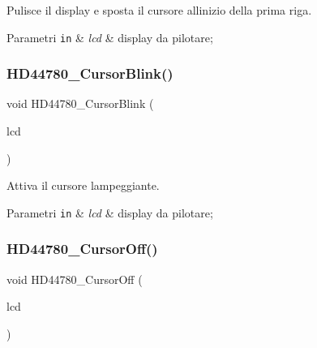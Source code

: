 Pulisce il display e sposta il cursore all\textquotesingle{}inizio della prima riga. 


\begin{DoxyParams}[1]{Parametri}
\mbox{\tt in}  & {\em lcd} & display da pilotare; \\
\hline
\end{DoxyParams}
\mbox{\label{group___h_d44780_ga92eb58cb7d73c9a87b7087a9c56f73d5}} 
\subsubsection{\texorpdfstring{H\+D44780\+\_\+\+Cursor\+Blink()}{HD44780\_CursorBlink()}}
{\footnotesize\ttfamily void H\+D44780\+\_\+\+Cursor\+Blink (\begin{DoxyParamCaption}\item[{\hyperlink{struct_h_d44780___l_c_d__t}{H\+D44780\+\_\+\+L\+C\+D\+\_\+t} $\ast$}]{lcd }\end{DoxyParamCaption})}



Attiva il cursore lampeggiante. 


\begin{DoxyParams}[1]{Parametri}
\mbox{\tt in}  & {\em lcd} & display da pilotare; \\
\hline
\end{DoxyParams}
\mbox{\label{group___h_d44780_ga56421dc398825188aa10257063a3ee4b}} 
\subsubsection{\texorpdfstring{H\+D44780\+\_\+\+Cursor\+Off()}{HD44780\_CursorOff()}}
{\footnotesize\ttfamily void H\+D44780\+\_\+\+Cursor\+Off (\begin{DoxyParamCaption}\item[{\hyperlink{struct_h_d44780___l_c_d__t}{H\+D44780\+\_\+\+L\+C\+D\+\_\+t} $\ast$}]{lcd }\end{DoxyParamCaption})}



